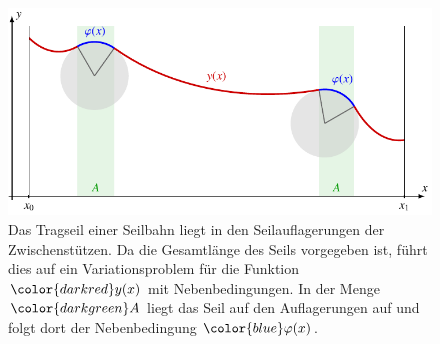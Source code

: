 %
%
%
\begin{figure}
\centering
\includegraphics{chapters/050-nebenbedingungen/images/seilbahn.pdf}
\caption{Das Tragseil einer Seilbahn liegt in den Seilauflagerungen der
Zwischenstützen.
Da die Gesamtlänge des Seils vorgegeben ist, führt dies auf ein
Variationsproblem für die Funktion ${\color{darkred}y(x)}$ mit Nebenbedingungen.
In der Menge ${\color{darkgreen}A}$ liegt das Seil auf den Auflagerungen
auf und folgt dort der Nebenbedingung ${\color{blue}\varphi(x)}$.
\label{buch:nebenbedingungen:fig:seilbahn}}
\end{figure}
